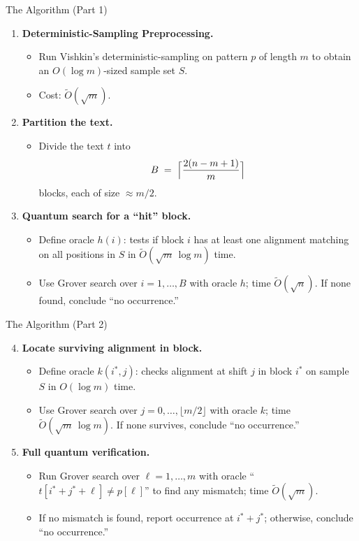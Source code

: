\documentclass{beamer}
\begin{document}
\begin{frame}{The Algorithm (Part 1)}
  \begin{enumerate}
    \item \textbf{Deterministic-Sampling Preprocessing.}
          \begin{itemize}
            \item Run Vishkin's deterministic-sampling on pattern \(p\) of length \(m\) to obtain an \(O(\log m)\)-sized sample set \(S\).
            \item Cost: \(\widetilde{O}(\sqrt{m})\).
          \end{itemize}
    \item \textbf{Partition the text.}
          \begin{itemize}
            \item Divide the text \(t\) into
                  \[
                    B \;=\; \Bigl\lceil \frac{2(n - m + 1)}{m} \Bigr\rceil
                  \]
                  blocks, each of size \(\approx m/2\).
          \end{itemize}
    \item \textbf{Quantum search for a “hit” block.}
          \begin{itemize}
            \item Define oracle \(h(i)\): tests if block \(i\) has at least one alignment matching on all positions in \(S\) in \(\widetilde O(\sqrt{m}\,\log m)\) time.
            \item Use Grover search over \(i=1,\dots,B\) with oracle \(h\); time \(\widetilde{O}(\sqrt{n})\). If none found, conclude “no occurrence.”
          \end{itemize}
  \end{enumerate}
\end{frame}

\begin{frame}{The Algorithm (Part 2)}
  \begin{enumerate}
    \setcounter{enumi}{3}
    \item \textbf{Locate surviving alignment in block.}
          \begin{itemize}
            \item Define oracle \(k(i^*,j)\): checks alignment at shift \(j\) in block \(i^*\) on sample \(S\) in \(O(\log m)\) time.
            \item Use Grover search over \(j=0,\dots,\lfloor m/2\rfloor\) with oracle \(k\); time \(\widetilde O(\sqrt{m}\,\log m)\). If none survives, conclude “no occurrence.”
          \end{itemize}
    \item \textbf{Full quantum verification.}
          \begin{itemize}
            \item Run Grover search over \(\ell=1,\dots,m\) with oracle “\(t[i^*+j^*+\ell]\neq p[\ell]\)” to find any mismatch; time \(\widetilde O(\sqrt{m})\).
            \item If no mismatch is found, report occurrence at \(i^*+j^*\); otherwise, conclude “no occurrence.”
          \end{itemize}
  \end{enumerate}
\end{frame}
\end{document}
